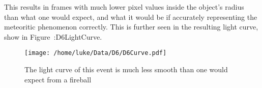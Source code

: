 This results in frames with much lower pixel values inside the object's radius than what one would expect, and what it would be if accurately representing the meteoritic phenomenon correctly. This is further seen in the resulting light curve, show in Figure~:{D6LightCurve}.

\begin{figure}[ht!]
	\centering
	\texttt{[image: /home/luke/Data/D6/D6Curve.pdf]}
	\caption{The light curve of this event is much less smooth than one would expect from a fireball}
	\label{fig:D6LightCurve}
\end{figure}
